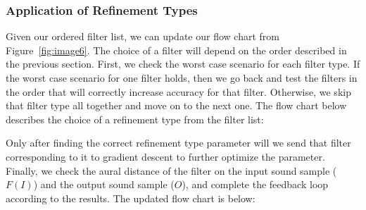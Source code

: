 \subsubsection{Application of Refinement Types}

Given our ordered filter list, we can update our flow chart from Figure~\ref{fig:image6}. The choice of a filter will depend on the order described in the previous section. First, we check the worst case scenario for each filter type. If the worst case scenario for one filter holds, then we go back and test the filters in the order that will correctly increase accuracy for that filter. Otherwise, we skip that filter type all together and move on to the next one. The flow chart below describes the choice of a refinement type from the filter list:

Only after finding the correct refinement type parameter will we send that filter corresponding to it to gradient descent to further optimize the parameter. Finally, we check the aural distance of the filter on the input sound sample ($F(I)$) and the output sound sample ($O$), and complete the feedback loop according to the results. The updated flow chart is below:


\begin{comment}
Once an order has been found that best optimizes the refinement type list, we then need to apply the refinement types. In order to apply the refinement type, we will go through our refinement type list and test each if each one holds true on the spectrogram of the input and output sound samples, skipping the ones accordingly as described above. We will start with the refinement types of the same type and check different parameter levels after that. Once we know a refinement type doesn't work, we can remove it from the list of refinement types. This will decrease the time it takes to look up refinement types if we need to apply more than one filter to our sound sample. Once we find a refinement type that works, we apply the filter corresponding to that refinement type to the input sound file and send that file to gradient descent. We will then come up with a threshold for the lowpass and highpass filter and send that threshold and filter to the aural distance function.
\end{comment}

